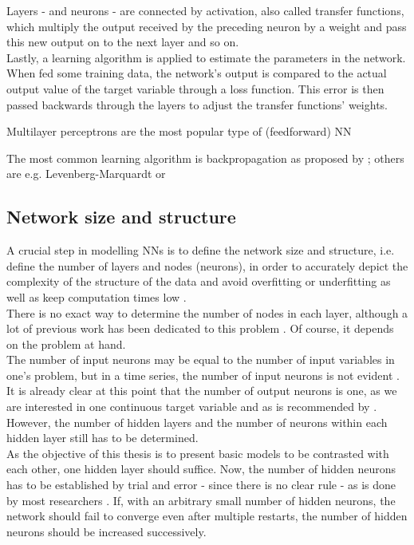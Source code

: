 \documentclass[a4paper, 11pt]{article}
\begin{document}
Layers - and neurons - are connected by activation, also called transfer functions, which multiply the output received by the preceding neuron by a weight and pass this new output on to the next layer and so on.\\
Lastly, a learning algorithm is applied to estimate the parameters in the network. When fed some training data, the network's output is compared to the actual output value of the target variable through a loss function. This error is then passed backwards through the layers to adjust the transfer functions' weights.

Multilayer perceptrons are the most popular type of (feedforward) NN \citep{Balkin.1997, Benkachcha.2015}

The most common learning algorithm is backpropagation as proposed by \cite{Rumelhart.1986}; others are e.g. Levenberg-Marquardt or 

\subsection{Network size and structure}

A crucial step in modelling NNs is to define the network size and structure, i.e. define the number of layers and nodes (neurons), in order to accurately depict the complexity of the structure of the data and avoid overfitting or underfitting as well as keep computation times low \citep{Karsoliya.2012}.\\
There is no exact way to determine the number of nodes in each layer, although a lot of previous work has been dedicated to this problem \citep{Karsoliya.2012}. Of course, it depends on the problem at hand.\\
The number of input neurons may be equal to the number of input variables in one's problem, but in a time series, the number of input neurons is not evident \citep{Zhang.1998}.
It is already clear at this point that the number of output neurons is one, as we are interested in one continuous target variable and as is recommended by \cite{Karsoliya.2012}.\\

However, the number of hidden layers and the number of neurons within each hidden layer still has to be determined. \\
As the objective of this thesis is to present basic models to be contrasted with each other, one hidden layer should suffice. Now, the number of hidden neurons has to be established by trial and error - since there is no clear rule - as is done by most researchers \citep{Karsoliya.2012}. If, with an arbitrary small number of hidden neurons, the network should fail to converge even after multiple restarts, the number of hidden neurons should be increased successively. \\
\end{document}

